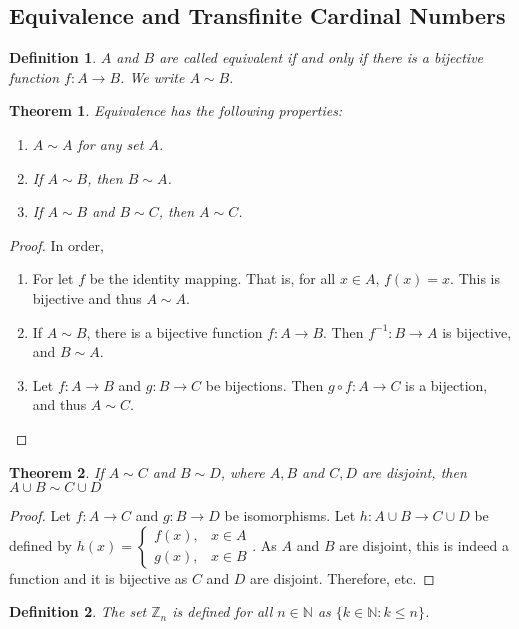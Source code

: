 \documentclass[crop=false,class=book]{standalone}
\theoremstyle{mystyle}
\newtheorem{theorem}{Theorem}[section]
\newtheorem{definition}{Definition}[section]
\begin{document}
\subsection{Equivalence and Transfinite Cardinal Numbers}
\begin{definition}
$A$ and $B$ are called equivalent if and only if there is a bijective function $f:A\rightarrow B$. We write $A\sim B$.
\end{definition}
\begin{theorem}
Equivalence has the following properties:
\begin{enumerate}
\item $A\sim A$ for any set $A$.
\item If $A\sim B$, then $B\sim A$.
\item If $A\sim B$ and $B\sim C$, then $A\sim C$.
\end{enumerate}
\end{theorem}
\begin{proof}
In order,
\begin{enumerate}
\item For let $f$ be the identity mapping. That is, for all $x\in A$, $f(x) = x$. This is bijective and thus $A\sim A$.
\item If $A\sim B$, there is a bijective function $f:A\rightarrow B$. Then $f^{-1}:B\rightarrow A$ is bijective, and $B\sim A$.
\item Let $f:A\rightarrow B$ and $g:B\rightarrow C$ be bijections. Then $g\circ f:A\rightarrow C$ is a bijection, and thus $A\sim C$.
\end{enumerate}
\end{proof}
\begin{theorem}
If $A\sim C$ and $B\sim D$, where $A,B$ and $C,D$ are disjoint, then $A\cup B \sim C\cup D$
\end{theorem}
\begin{proof}
Let $f:A\rightarrow C$ and $g:B\rightarrow D$ be isomorphisms. Let $h:A\cup B \rightarrow C\cup D$ be defined by $h(x) = \begin{cases} f(x), & x\in A\\ g(x), & x\in B\end{cases}$. As $A$ and $B$ are disjoint, this is indeed a function and it is bijective as $C$ and $D$ are disjoint. Therefore, etc.
\end{proof}
\begin{definition}
The set $\mathbb{Z}_n$ is defined for all $n\in \mathbb{N}$ as $\{k\in \mathbb{N}: k\leq n\}$.
\end{definition}
\end{document}
